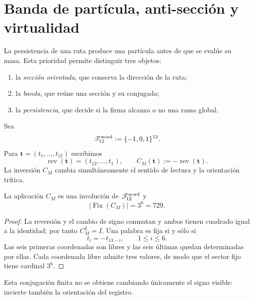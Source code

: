 \chapter{Banda de partícula, anti-sección y virtualidad}
\label{chap:banda-particula-virtual}

La persistencia de una ruta produce una partícula antes de que se evalúe su
masa. Esta prioridad permite distinguir tres objetos:

\begin{enumerate}
\item la \emph{sección orientada}, que conserva la dirección de la ruta;
\item la \emph{banda}, que reúne una sección y su conjugada;
\item la \emph{persistencia}, que decide si la firma alcanza o no una rama
global.
\end{enumerate}

\begin{definition}
\label{def:palabras-cm}
Sea
\[
 \mathscr T_{12}^{\rm word}:=\{-1,0,1\}^{12}.
\]
Para \(\mathbf t=(t_1,\ldots,t_{12})\) escribimos
\[
 \operatorname{rev}(\mathbf t)
 =(t_{12},\ldots,t_1),
 \qquad
 C_M(\mathbf t):=-\operatorname{rev}(\mathbf t).
\]
La inversión \(C_M\) cambia simultáneamente el sentido de lectura y la
orientación trítica.
\end{definition}

\begin{theorem}
\label{thm:involucion-cm-censo}
La aplicación \(C_M\) es una involución de
\(\mathscr T_{12}^{\rm word}\) y
\[
 \left|\operatorname{Fix}(C_M)\right|=3^6=729.
\]
\end{theorem}

\begin{proof}
La reversión y el cambio de signo conmutan y ambos tienen cuadrado igual a
la identidad; por tanto \(C_M^2=I\). Una palabra es fija si y sólo si
\[
 t_i=-t_{13-i},\qquad 1\leq i\leq6.
\]
Las seis primeras coordenadas son libres y las seis últimas quedan
determinadas por ellas. Cada coordenada libre admite tres valores, de modo
que el sector fijo tiene cardinal \(3^6\).
\end{proof}

Esta conjugación finita no se obtiene cambiando únicamente el signo visible:
invierte también la orientación del registro.

